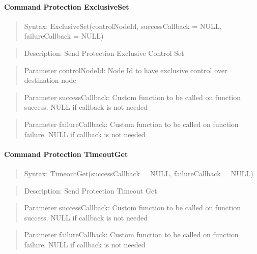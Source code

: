 \paragraph{Command Protection ExclusiveSet}
\begin{quote}Syntax: ExclusiveSet(controlNodeId, successCallback = NULL, failureCallback = NULL)\end{quote}
\begin{quote}Description: Send Protection Exclusive Control Set\end{quote}
\begin{quote}Parameter controlNodeId: Node Id to have exclusive control over destination node\end{quote}
\begin{quote}Parameter successCallback: Custom function to be called on function success. NULL if callback is not needed\end{quote}
\begin{quote}Parameter failureCallback: Custom function to be called on function failure. NULL if callback is not needed\end{quote}


\paragraph{Command Protection TimeoutGet}
\begin{quote}Syntax: TimeoutGet(successCallback = NULL, failureCallback = NULL)\end{quote}
\begin{quote}Description: Send Protection Timeout Get\end{quote}
\begin{quote}Parameter successCallback: Custom function to be called on function success. NULL if callback is not needed\end{quote}
\begin{quote}Parameter failureCallback: Custom function to be called on function failure. NULL if callback is not needed\end{quote}



